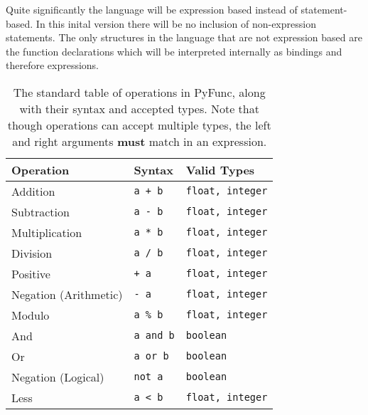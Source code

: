 \documentclass{l4proj}
\begin{document}
Quite significantly the language will be expression based instead of statement-based.
In this inital version there will be no inclusion of non-expression statements.
The only structures in the language that are not expression based are the function declarations which will be interpreted internally as bindings and therefore expressions.



\begin{table}[h!]
    \caption{The standard table of operations in PyFunc, along with their syntax and accepted types. Note that though operations can accept multiple types, the left and right arguments \textbf{must} match in an expression.}\label{tab:operators}
    \begin{center}
    \begin{tabular}{@{}|l|l|l|@{}}
    \hline
    \textbf{Operation}    & \textbf{Syntax}       &   \textbf{Valid Types}    \\ %
    \hline
    Addition              & \texttt{a + b}        &   \texttt{float, integer} \\
    Subtraction           & \texttt{a - b}        &   \texttt{float, integer} \\
    Multiplication        & \texttt{a * b}        &   \texttt{float, integer} \\
    Division              & \texttt{a / b}        &   \texttt{float, integer} \\
    Positive              & \texttt{+ a}          &   \texttt{float, integer} \\
    Negation (Arithmetic) & \texttt{- a}          &   \texttt{float, integer} \\
    Modulo                & \texttt{a \% b}       &   \texttt{float, integer} \\
    And                   & \texttt{a and b}      &   \texttt{boolean}        \\
    Or                    & \texttt{a or b}       &   \texttt{boolean}        \\
    Negation (Logical)    & \texttt{not a}        &   \texttt{boolean}        \\
    Less                  & \texttt{a < b}        &   \texttt{float, integer} \\

\end{tabular}
\end{center}
\end{table}
\end{document}

